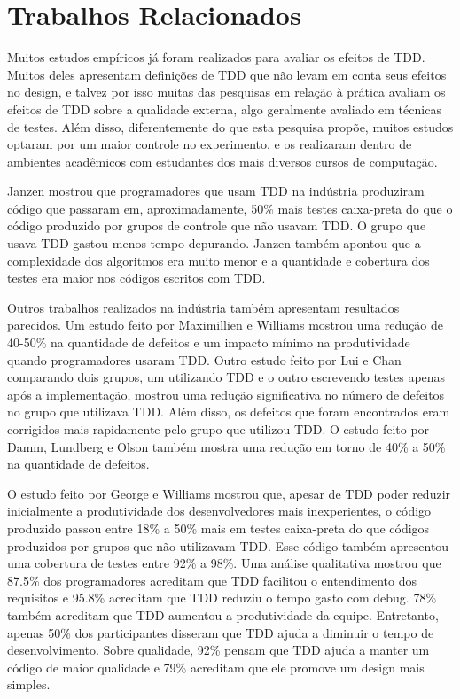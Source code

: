 \chapter{Trabalhos Relacionados}
\label{cap:trabalhos-relacionados}

Muitos estudos empíricos já foram realizados para avaliar os efeitos de TDD.
Muitos deles apresentam definições
de TDD que não levam em conta seus efeitos no design, e talvez por isso muitas das 
pesquisas em relação à prática avaliam os efeitos de TDD sobre a qualidade 
externa, algo geralmente avaliado em técnicas de testes.
Além disso, diferentemente
do que esta pesquisa propõe, muitos estudos optaram por um
maior controle no experimento, e os realizaram dentro de ambientes acadêmicos 
com estudantes dos mais diversos cursos de computação.

Janzen \cite{janzen-arch-improvement} mostrou que programadores que usam TDD na 
indústria produziram código que passaram em, aproximadamente, 50\% mais testes 
caixa-preta do que o código produzido por grupos de controle que não usavam TDD.
O grupo que usava TDD gastou menos tempo depurando. Janzen também 
apontou que a complexidade dos algoritmos era muito menor e a quantidade e
cobertura dos testes era maior nos códigos escritos com TDD.

Outros trabalhos realizados na indústria também apresentam resultados parecidos.
Um estudo feito por Maximillien e Williams \cite{max-e-williams} mostrou uma
redução de 40-50\% na quantidade de defeitos e um impacto mínimo na
produtividade quando programadores usaram TDD. Outro estudo feito por Lui e
Chan \cite{lui-e-chan} comparando dois grupos, um utilizando TDD e o outro 
escrevendo testes apenas após a implementação, mostrou uma redução significativa 
no número de defeitos no grupo que utilizava TDD. 
Além disso, os defeitos que foram encontrados eram 
corrigidos mais rapidamente pelo grupo que utilizou TDD. O estudo feito por 
Damm, Lundberg e Olson \cite{damn-lundberg-e-olson} também mostra uma redução
em torno de 40\% a 50\% na quantidade de defeitos.

O estudo feito por George e Williams \cite{george-e-williams} mostrou que,
apesar de TDD poder reduzir inicialmente a produtividade dos desenvolvedores 
mais inexperientes, o código produzido passou entre 18\% a 50\% mais em testes 
caixa-preta do que códigos produzidos por grupos que não utilizavam TDD. Esse
código também apresentou uma cobertura de testes entre 92\% a 98\%. Uma análise
qualitativa mostrou que 87.5\% dos programadores acreditam que TDD facilitou o 
entendimento dos requisitos e 95.8\% acreditam que TDD reduziu o tempo gasto com
debug. 78\% também acreditam que TDD aumentou a produtividade da equipe. 
Entretanto, apenas 50\% dos participantes disseram que TDD ajuda a diminuir o tempo de 
desenvolvimento. Sobre qualidade, 92\% pensam que TDD ajuda a manter um
código de maior qualidade e 79\% acreditam que ele promove um design mais simples.

